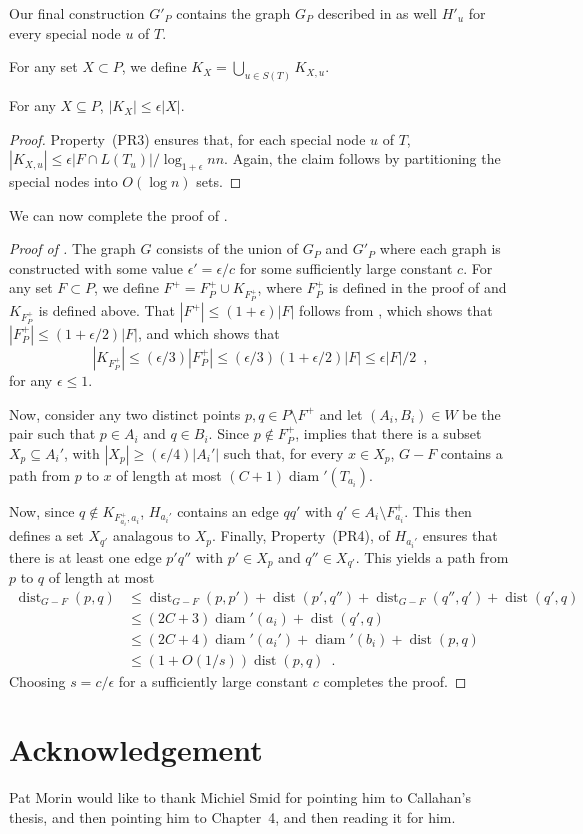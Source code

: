 \documentclass{patmorin}
\DeclareMathOperator{\diam}{diam}
\DeclareMathOperator{\dist}{dist}
\begin{document}
Our final construction $G'_P$ contains the graph $G_P$ described in
 as well $H'_u$ for every special node $u$ of $T$.

For any set $X\subset P$, we define $K_{X} = \bigcup_{u\in
S(T)} K_{X,u}$.

\begin{clm}
  For any $X\subseteq P$, $|K_{X}| \le \epsilon|X|$.
\end{clm}

\begin{proof}
  Property~(PR3) ensures that, for each special node $u$ of $T$,
  $|K_{X,u}|\le \epsilon|F\cap L(T_u)|/\log_{1+\epsilon} n n$.  Again, the
  claim follows by partitioning the special nodes into $O(\log n)$ sets.
\end{proof}

We can now complete the proof of .

\begin{proof}[Proof of ]
  The graph $G$ consists of the union of $G_P$ and $G'_P$ where each
  graph is constructed with some value $\epsilon' = \epsilon/c$ for
  some sufficiently large constant $c$.  For any set $F\subset P$, we
  define $F^+ = F^+_P \cup K_{F^+_P}$, where $F^+_P$ is defined in the
  proof of  and $K_{F^+_P}$ is defined above.  
  That $|F^+| \le (1+\epsilon)|F|$
  follows from , which shows that $|F^+_P|\le
  (1+\epsilon/2)|F|$, and  which shows that 
  \[
     |K_{F^+_P}|\le (\epsilon/3)|F^+_P|\le (\epsilon/3)(1+\epsilon/2)|F|
     \le \epsilon|F|/2 \enspace ,
  \]
  for any $\epsilon \le 1$.

  Now, consider any two distinct points $p,q\in P\setminus F^+$ and
  let $(A_i,B_i)\in W$ be the pair such that $p\in A_i$ and $q\in B_i$.
  Since $p\not\in F^+_P$,  implies that there is a
  subset $X_{p}\subseteq A_i'$, with $|X_{p}|\ge (\epsilon/4)|A_i'|$
  such that, for every $x\in X_{p}$, $G-F$ contains a path from $p$
  to $x$ of length at most $(C+1)\diam'(T_{a_i})$.
  
  Now, since $q\not\in K_{F^+_{a_i},a_i}$, $H_{a_i'}$ contains an edge
  $qq'$ with $q'\in A_i\setminus F^+_{a_i}$.  This then defines a set
  $X_{q'}$ analagous to $X_{p}$.  Finally, Property~(PR4), of $H_{a_i'}$
  ensures that there is at least one edge $p'q''$ with $p'\in X_{p}$
  and $q''\in X_{q'}$.  This yields a path from $p$ to $q$ of length at most
  \begin{align*}
    \dist_{G-F}(p,q) & \le \dist_{G-F}(p,p') + \dist(p',q'') + \dist_{G-F}(q'',q') + \dist(q',q) \\
      & \le (2C+3)\diam'(a_i) + \dist(q',q) \\
      & \le (2C+4)\diam'(a_i') + \diam'(b_i) + \dist(p,q) \\
      & \le (1+O(1/s))\dist(p,q) \enspace . 
  \end{align*}
  Choosing $s = c/\epsilon$ for a sufficiently large constant $c$
  completes the proof.
\end{proof}

\section*{Acknowledgement}

Pat Morin would like to thank Michiel Smid for pointing him to Callahan's thesis, and then pointing him to Chapter~4, and then reading it for him.




\end{document}
